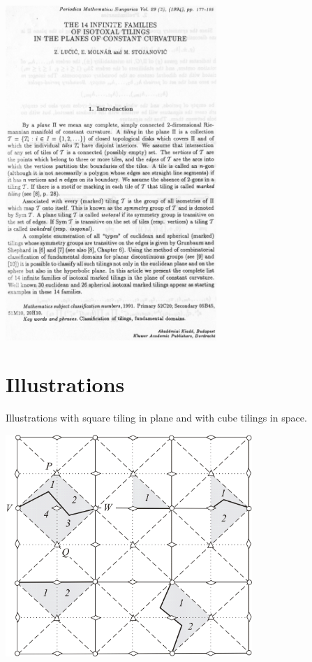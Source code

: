 \begin{frame}
  \center\includegraphics[width=0.6\textwidth]{illustration2.png}
\end{frame}

\section{Illustrations}
\begin{frame}
  Illustrations with square tiling in plane and with cube tilings in space.

  \center\includegraphics[width=0.7\textwidth]{illustration3.png}
\end{frame}

